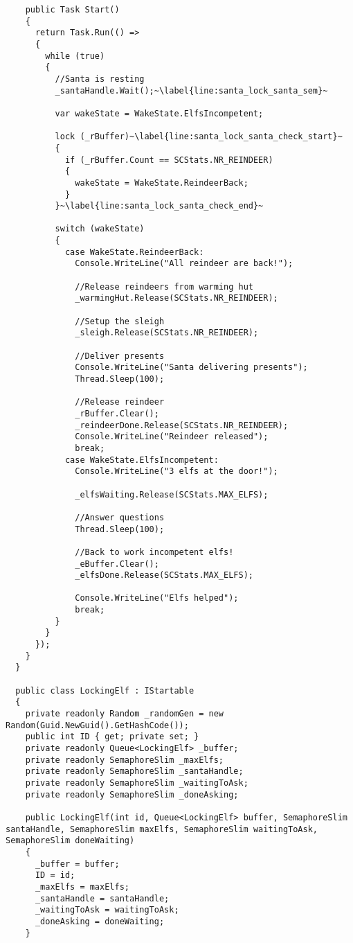 \begin{lstlisting}
    public Task Start()
    {
      return Task.Run(() =>
      {
        while (true)
        {
          //Santa is resting
          _santaHandle.Wait();~\label{line:santa_lock_santa_sem}~

          var wakeState = WakeState.ElfsIncompetent;

          lock (_rBuffer)~\label{line:santa_lock_santa_check_start}~
          {
            if (_rBuffer.Count == SCStats.NR_REINDEER)
            {
              wakeState = WakeState.ReindeerBack;    
            }
          }~\label{line:santa_lock_santa_check_end}~

          switch (wakeState)
          {
            case WakeState.ReindeerBack:
              Console.WriteLine("All reindeer are back!");

              //Release reindeers from warming hut
              _warmingHut.Release(SCStats.NR_REINDEER);

              //Setup the sleigh
              _sleigh.Release(SCStats.NR_REINDEER);

              //Deliver presents
              Console.WriteLine("Santa delivering presents");
              Thread.Sleep(100);

              //Release reindeer
              _rBuffer.Clear();
              _reindeerDone.Release(SCStats.NR_REINDEER);
              Console.WriteLine("Reindeer released");
              break;
            case WakeState.ElfsIncompetent:
              Console.WriteLine("3 elfs at the door!");

              _elfsWaiting.Release(SCStats.MAX_ELFS);

              //Answer questions
              Thread.Sleep(100);

              //Back to work incompetent elfs!
              _eBuffer.Clear();
              _elfsDone.Release(SCStats.MAX_ELFS);

              Console.WriteLine("Elfs helped");
              break;
          }
        }
      });
    }
  }
  
  public class LockingElf : IStartable
  {
    private readonly Random _randomGen = new Random(Guid.NewGuid().GetHashCode());
    public int ID { get; private set; }
    private readonly Queue<LockingElf> _buffer;
    private readonly SemaphoreSlim _maxElfs;
    private readonly SemaphoreSlim _santaHandle;
    private readonly SemaphoreSlim _waitingToAsk;
    private readonly SemaphoreSlim _doneAsking;

    public LockingElf(int id, Queue<LockingElf> buffer, SemaphoreSlim santaHandle, SemaphoreSlim maxElfs, SemaphoreSlim waitingToAsk, SemaphoreSlim doneWaiting)
    {
      _buffer = buffer;
      ID = id;
      _maxElfs = maxElfs;
      _santaHandle = santaHandle;
      _waitingToAsk = waitingToAsk;
      _doneAsking = doneWaiting;
    }


\end{lstlisting}
